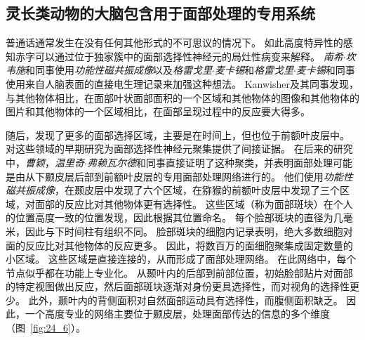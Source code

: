 \subsection{灵长类动物的大脑包含用于面部处理的专用系统}

普通话通常发生在没有任何其他形式的不可思议的情况下。
如此高度特异性的感知赤字可以通过位于独家簇中的面部选择性神经元的局灶性病变来解释。
\textit{南希$\cdot$坎韦施}和同事使用\textit{功能性磁共振成像}以及\textit{格雷戈里$\cdot$麦卡锡}和\textit{格雷戈里$\cdot$麦卡锡}和同事使用来自人脑表面的直接电生理记录来加强这种想法。
Kanwisher及其同事发现，与其他物体相比，在面部叶状面部面积的一个区域和其他物体的图像和其他物体的图片和其他物体的一个区域相比，在面部呈现过程中的反应要大得多。


随后，发现了更多的面部选择区域，主要是在时间上，但也位于前额叶皮层中。
对这些领域的早期研究为面部选择性神经元聚集提供了间接证据。
在后来的研究中，\textit{曹颖}，\textit{温里奇$\cdot$弗赖瓦尔德}和同事直接证明了这种聚类，并表明面部处理可能是由从下颞皮层后部到前额叶皮层的专用面部处理网络进行的。
他们使用\textit{功能性磁共振成像}，在颞皮层中发现了六个区域，在猕猴的前额叶皮层中发现了三个区域，对面部的反应比对其他物体更有选择性。
这些区域（称为面部斑块）在个人的位置高度一致的位置发现，因此根据其位置命名。
每个脸部斑块的直径为几毫米，因此与下时间柱有组织不同。
脸部斑块的细胞内记录表明，绝大多数细胞对面的反应比对其他物体的反应更多。
因此，将数百万的面细胞聚集成固定数量的小区域。
这些区域是直接连接的，从而形成了面部处理网络。
在此网络中，每个节点似乎都在功能上专业化。
从颞叶内的后部到前部位置，初始脸部贴片对面部的特定视图做出反应，然后面部斑块逐渐对身份更具选择性，而对视角的选择性更少。 
此外，颞叶内的背侧面积对自然面部运动具有选择性，而腹侧面积缺乏。
因此，一个高度专业的网络主要位于颞皮层，处理面部传达的信息的多个维度（图~\ref{fig:24_6}）。



